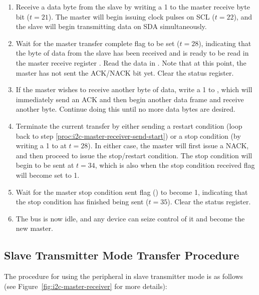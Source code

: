 \begin{enumerate}
	\item Receive a data byte from the slave by writing a 1 to the master receive byte bit  ($t = 21$). The master will begin issuing clock pulses on SCL ($t = 22$), and the slave will begin transmitting data on SDA simultaneously.
	\item Wait for the master transfer complete flag  to be set ($t = 28$), indicating that the byte of data from the slave has been received and is ready to be read in the master receive register . Read the data in . Note that at this point, the master has not sent the ACK/NACK bit yet. Clear the status register.
	\item If the master wishes to receive another byte of data, write a 1 to , which will immediately send an ACK and then begin another data frame and receive another byte. Continue doing this until no more data bytes are desired.
	\item Terminate the current transfer by either sending a restart condition (loop back to step \ref{proc:i2c-master-receiver-send-start}) or a stop condition (by writing a 1 to  at $t = 28$). In either case, the master will first issue a NACK, and then proceed to issue the stop/restart condition. The stop condition will begin to be sent at $t = 34$, which is also when the stop condition received flag  will become set to 1.
	\item Wait for the master stop condition sent flag () to become 1, indicating that the stop condition has finished being sent ($t = 35$). Clear the status register.
	\item The bus is now idle, and any device can seize control of it and become the new master.
\end{enumerate}



\subsection{Slave Transmitter Mode Transfer Procedure}

The procedure for using the  peripheral in slave transmitter mode is as follows (see Figure~\ref{fig:i2c-master-receiver} for more details):

